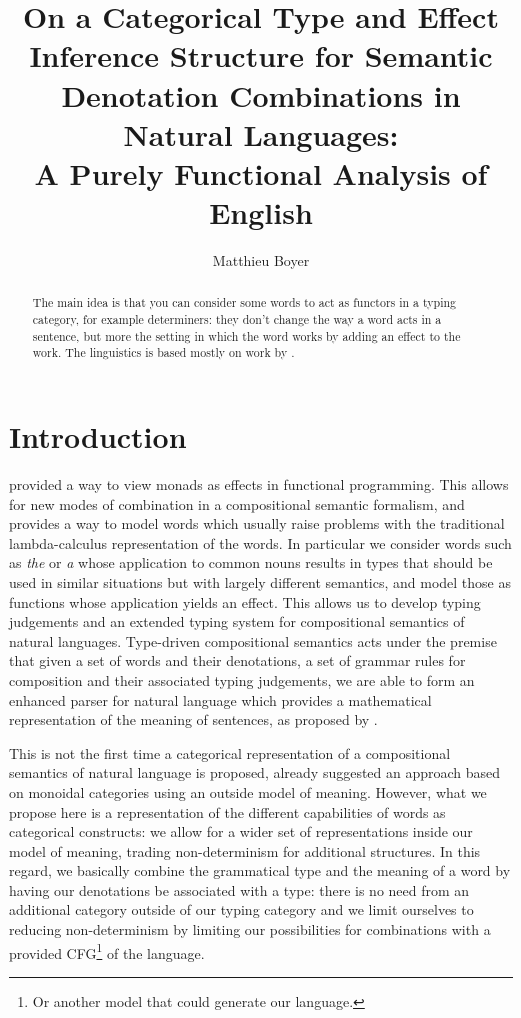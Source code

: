 \documentclass[math, english, info]{cours}
\title{On a Categorical Type and Effect Inference Structure for Semantic Denotation Combinations in Natural Languages:\\ A Purely Functional Analysis of English}
\author{Matthieu Boyer}
\begin{document}
\bettertitle

\begin{abstract}
	The main idea is that you can consider some words to act as functors in a typing category, for example determiners:
	they don't change the way a word acts in a sentence,
	but more the setting in which the word works by adding an effect to the work.
	The linguistics is based mostly on work by .
\end{abstract}

\section*{Introduction}
 provided a way to view monads as effects
in functional programming. This allows for new modes of combination in a compositional
semantic formalism, and provides a way to model words which usually raise problems with the
traditional lambda-calculus representation of the words. In particular we consider words such
as \textsl{the} or \textsl{a} whose application to common nouns results in types that should
be used in similar situations but with largely different semantics, and model those as
functions whose application yields an effect. This allows us to develop typing judgements and
an extended typing system for compositional semantics of natural languages.
Type-driven compositional semantics acts under the premise that given a set of words and their
denotations, a set of grammar rules for composition and their associated typing judgements,
we are able to form an enhanced parser for natural language which provides a mathematical
representation of the meaning of sentences, as proposed by .

\medskip

This is not the first time a categorical representation of a compositional semantics of
natural language is proposed, 
already suggested an approach based on monoidal categories using an outside model of meaning.
However, what we propose here is a representation of the different capabilities of words
as categorical constructs: we allow for a wider set of representations inside our
model of meaning, trading non-determinism for additional structures.
In this regard, we basically combine the grammatical type and the meaning of a word
by having our denotations be associated with a type: there is no need from an additional
category outside of our typing category and we limit ourselves to reducing non-determinism
by limiting our possibilities for combinations with a provided CFG\footnote{Or another model
	that could generate our language.} of the language.
\end{document}
